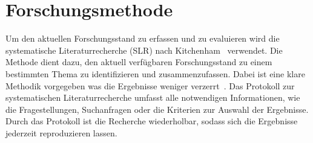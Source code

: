 \documentclass[conference,compsoc]{IEEEtran}
\begin{document}
%






\section{Forschungsmethode}
Um den aktuellen Forschungsstand zu erfassen und zu evaluieren wird die systematische Literaturrecherche (SLR) nach Kitchenham~\cite{kitchenham2004evidence,keele2007guidelines} verwendet. Die Methode dient dazu, den aktuell verfügbaren Forschungsstand zu einem bestimmten Thema zu identifizieren und zusammenzufassen. Dabei ist eine klare Methodik vorgegeben was die Ergebnisse weniger verzerrt~\cite{keele2007guidelines}.
Das Protokoll zur systematischen Literaturrecherche umfasst alle notwendigen Informationen, wie die Fragestellungen, Suchanfragen oder die Kriterien zur Auswahl der Ergebnisse. Durch das Protokoll ist die Recherche wiederholbar, sodass sich die Ergebnisse jederzeit reproduzieren lassen.
\end{document}
